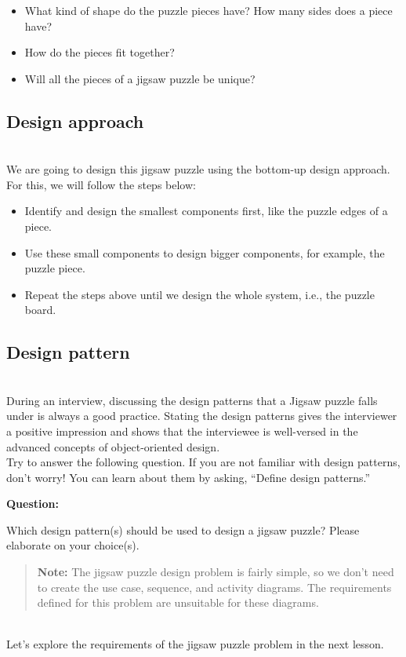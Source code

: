 \begin{itemize}
\item
\protect{}\label{bdrYDW5L1oMHmutG6x1br}
What kind of shape do the puzzle pieces have? How many sides does a piece have?
\item
\protect{}\label{KeI5RfYv32SmntmgLaJeq}
How do the pieces fit together?
\item
\protect{}\label{7o7pVJ9hz_1Gh22pX41Wi}
Will all the pieces of a jigsaw puzzle be unique?
\end{itemize}

\subsection{Design approach}\label{vg8AyrA0AiZpcHdYlm66h}
\\
We are going to design this jigsaw puzzle using the bottom-up design approach. For this, we will follow the steps below:

\begin{itemize}
\item
\protect{}\label{DSjo47UsNJ5Y3ENEHER9B}
Identify and design the smallest components first, like the puzzle edges of a piece.
\item
\protect{}\label{NDvlqEyWQQVIpkf7ek3jw}
Use these small components to design bigger components, for example, the puzzle piece.
\item
\protect{}\label{ERmVPZzltKkBVascbV3ut}
Repeat the steps above until we design the whole system, i.e., the puzzle board.
\end{itemize}

\subsection{Design pattern~}\label{XVqQEsvv81EWEPHJfE7VB}
\\
During an interview, discussing the design patterns that a Jigsaw puzzle falls under is always a good practice. Stating the design patterns gives the interviewer a positive impression and shows that the interviewee is well-versed in the advanced concepts of object-oriented design.
\\
Try to answer the following question. If you are not familiar with design patterns, don't worry! You can learn about them by asking, ``Define design patterns.''

\textbf{Question:}

Which design pattern(s) should be used to design a jigsaw puzzle? Please elaborate on your choice(s).

\begin{quote}
\textbf{Note:} The jigsaw puzzle design problem is fairly simple, so we don't need to create the use case, sequence, and activity diagrams. The requirements defined for this problem are unsuitable for these diagrams.
\end{quote}
\\
Let's explore the requirements of the jigsaw puzzle problem in the next lesson.


